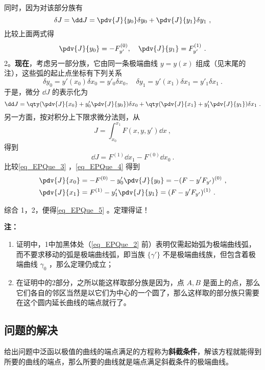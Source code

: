 同时，因为对该部分族有
\begin{equation}
\delta J=\dd J=\pdv{J}{y_0}\delta y_0+\pdv{J}{y_1}\delta y_1~,
\end{equation}
比较上面两式得
\begin{equation}
\pdv{J}{y_0}=-F_{y'}^{(0)},\quad \pdv{J}{y_1}=F_{y'}^{(1)}~.
\end{equation}
2。\textbf{现在}，考虑另一部分族，它由同一条极端曲线 $y=y(x)$ 组成（见末尾的注），这些弧的起止点坐标有下列关系
\begin{equation}
\delta y_0=y'(x_0)\delta x_0=y'_0\delta x_0,\quad \delta y_1=y'(x_1)\delta x_1=y'_1\delta x_1~.
\end{equation}
于是，微分 $\dd J$ 的表示化为
\begin{equation}\label{eq_EPQue_3}
\dd J=\qty(\pdv{J}{x_0}+y'_0\pdv{J}{y_0})\delta x_0+\qty(\pdv{J}{x_1}+y'_1\pdv{J}{y_1})\delta x_1~.
\end{equation}
另一方面，按对积分上下限求微分法则，从
\begin{equation}
J=\int_{x_0}^{x_1}F(x,y,y')\dd x~,
\end{equation}
得到
\begin{equation}\label{eq_EPQue_4}
\dd J=F^{(1)}\dd x_1-F^{(0)}\dd x_0~.
\end{equation}
比较\autoref{eq_EPQue_3} ，\autoref{eq_EPQue_4} 得到
\begin{equation}
\begin{aligned}
&\pdv{J}{x_0}=-F^{(0)}-y'_0\pdv{J}{y_0}=-(F-y'F_{y'})^{(0)}~,\\
&\pdv{J}{x_1}=F^{(1)}-y'_1\pdv{J}{y_1}=(F-y'F_{y'})^{(1)}~.
\end{aligned}
\end{equation}

综合 1，2，便得\autoref{eq_EPQue_5} 。定理得证！

\textbf{注：}
\begin{enumerate}
\item 证明中，1中加黑体处（\autoref{eq_EPQue_2} 前）表明仅需起始弧为极端曲线弧，而不要求移动的弧是极端曲线弧，即当族 $\{\gamma'\}$ 不是极端曲线族，但包含着极端曲线 $\gamma_0$ ，那么定理仍成立；
\item 在证明中的2部分，之所以能这样取部分族是因为，点 $A,B$ 是面上的点，那么它们各自的邻区当然是以它们为中心的一个圆了，那么这样取的部分族只需要在这个圆内延长曲线的端点就行了。
\end{enumerate}
\subsection{问题的解决}
给出问题中泛函以极值的曲线的端点满足的方程称为\textbf{斜截条件}，解该方程就能得到所要的曲线的端点，那么所要的曲线就是端点满足斜截条件的极端曲线。